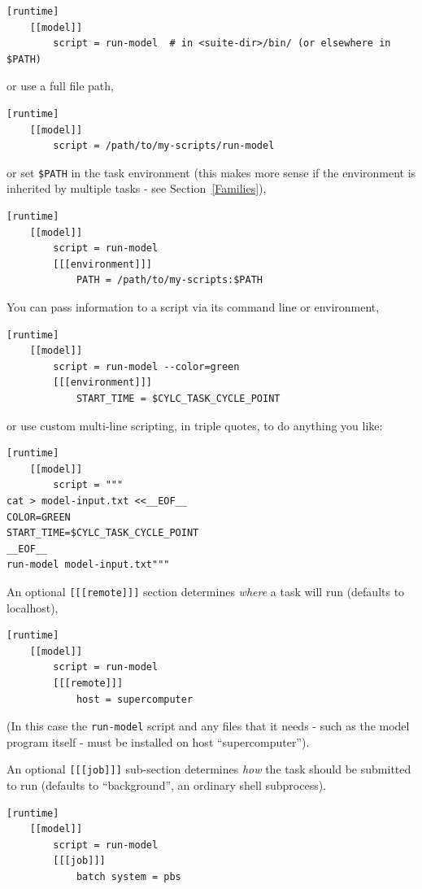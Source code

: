 \begin{lstlisting}[language=suiterc]
[runtime]
    [[model]]
        script = run-model  # in <suite-dir>/bin/ (or elsewhere in $PATH)
\end{lstlisting}

or use a full file path,

\begin{lstlisting}[language=suiterc]
[runtime]
    [[model]]
        script = /path/to/my-scripts/run-model
\end{lstlisting}

or set \lstinline{$PATH} in the task environment (this makes more sense
if the environment is inherited by multiple tasks - see
Section~\ref{Families}),
\begin{lstlisting}[language=suiterc]
[runtime]
    [[model]]
        script = run-model
        [[[environment]]]
            PATH = /path/to/my-scripts:$PATH
\end{lstlisting}

You can pass information to a script via its command line or environment,

\begin{lstlisting}[language=suiterc]
[runtime]
    [[model]]
        script = run-model --color=green
        [[[environment]]]
            START_TIME = $CYLC_TASK_CYCLE_POINT
\end{lstlisting}

or use custom multi-line scripting, in triple quotes, to do anything you like:
\begin{lstlisting}[language=suiterc]
[runtime]
    [[model]]
        script = """
cat > model-input.txt <<__EOF__
COLOR=GREEN
START_TIME=$CYLC_TASK_CYCLE_POINT
__EOF__
run-model model-input.txt"""
\end{lstlisting}

An optional \lstinline=[[[remote]]]= section determines {\em where} a task
will run (defaults to localhost), 

\begin{lstlisting}[language=suiterc]
[runtime]
    [[model]]
        script = run-model
        [[[remote]]]
            host = supercomputer
\end{lstlisting}
(In this case the \lstinline=run-model= script and any files that it needs -
such as the model program itself - must be installed on host ``supercomputer'').

An optional \lstinline=[[[job]]]= sub-section determines {\em how} the task
should be submitted to run (defaults to ``background'', an ordinary shell
subprocess).
\begin{lstlisting}[language=suiterc]
[runtime]
    [[model]]
        script = run-model
        [[[job]]]
            batch system = pbs
\end{lstlisting}


